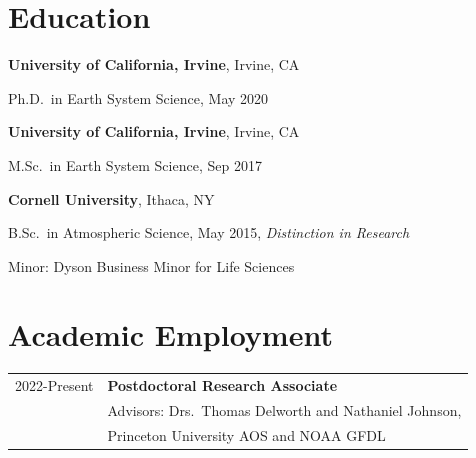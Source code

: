 \documentclass[margin,line,palatino,courier,10pt]{res}
\newenvironment{list1}{
  \begin{list}{\ding{113}}{%
      \setlength{\itemsep}{0in}
      \setlength{\parsep}{0in} \setlength{\parskip}{0in}
      \setlength{\topsep}{0in} \setlength{\partopsep}{0in}
      \setlength{\leftmargin}{0.17in}}}{\end{list}}
\begin{document}
\begin{resume}
\section{\sc \large{\textcolor{Cerulean}{\textbf{Education}}}}

{\bf University of California, Irvine}, Irvine, CA\\
\vspace*{-.12in}
\begin{list1}
\item[] Ph.D.~in Earth System Science, May 2020
\end{list1}

{\bf University of California, Irvine}, Irvine, CA\\
\vspace*{-.12in}
\begin{list1}
\item[] M.Sc.~in Earth System Science, Sep 2017
\end{list1}

{\bf Cornell University}, Ithaca, NY\\
\vspace*{-.12in}
\begin{list1}
\item[] B.Sc.~in Atmospheric Science, May 2015, \textit{Distinction in Research}

\hspace*{0.2in}  Minor: Dyson Business Minor for Life Sciences

\end{list1}

\section{\sc \textcolor{Cerulean}{\large{\textbf{Academic Employment}}}}
\vspace*{0.05in}
\begin{tabular}{@{}p{0.9in}p{4in}}
2022-Present & \textbf{Postdoctoral Research Associate}\\
& \hspace{0.2in} Advisors: Drs.\ Thomas Delworth and Nathaniel Johnson,\\
& \vspace{-0.18in}\hspace{0.2in} Princeton University AOS and NOAA GFDL\\


\end{tabular}
\end{resume}
\end{document}
